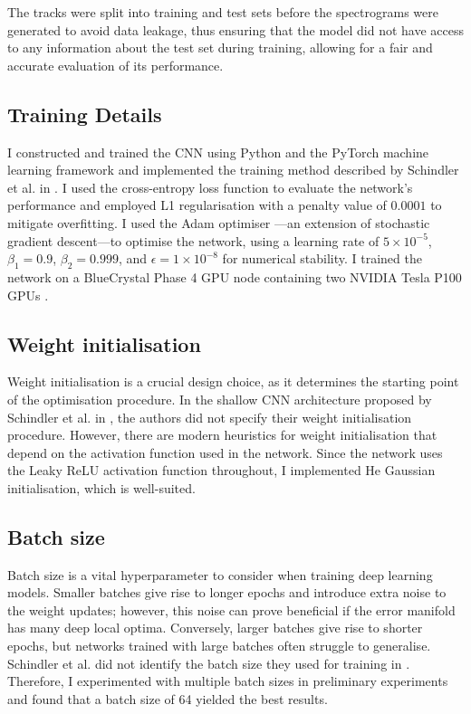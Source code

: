 \documentclass[conference]{IEEEtran}
\begin{document}
The tracks were split into training and test sets before the spectrograms were generated to avoid data leakage, thus ensuring that the model did not have access to any information about the test set during training, allowing for a fair and accurate evaluation of its performance.

\subsection{Training Details}

I constructed and trained the CNN using Python and the PyTorch \cite{PyTorch} machine learning framework and implemented the training method described by Schindler et al. in \cite{SchindlerLidyRauber}.
I used the cross-entropy loss function to evaluate the network's performance and employed L1 regularisation with a penalty value of $0.0001$ to mitigate overfitting.
I used the Adam optimiser \cite{KingmaBa}---an extension of stochastic gradient descent---to optimise the network, using a learning rate of $5\times10^{-5}$, $\beta_1=0.9$, $\beta_2=0.999$, and $\epsilon=1\times10^{-8}$ for numerical stability.
I trained the network on a BlueCrystal Phase 4 GPU node containing two NVIDIA Tesla P100 GPUs \cite{bc4}.

\subsection{Weight initialisation}

Weight initialisation is a crucial design choice, as it determines the starting point of the optimisation procedure.
In the shallow CNN architecture proposed by Schindler et al. in \cite{SchindlerLidyRauber}, the authors did not specify their weight initialisation procedure.
However, there are modern heuristics for weight initialisation that depend on the activation function used in the network.
Since the network uses the Leaky ReLU activation function throughout, I implemented He Gaussian initialisation, which is well-suited.

\subsection{Batch size}

Batch size is a vital hyperparameter to consider when training deep learning models.
Smaller batches give rise to longer epochs and introduce extra noise to the weight updates; however, this noise can prove beneficial if the error manifold has many deep local optima.
Conversely, larger batches give rise to shorter epochs, but networks trained with large batches often struggle to generalise.
Schindler et al. did not identify the batch size they used for training in \cite{SchindlerLidyRauber}.
Therefore, I experimented with multiple batch sizes in preliminary experiments and found that a batch size of 64 yielded the best results.
\end{document}
